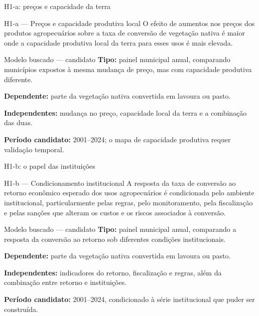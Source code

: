 \documentclass[aspectratio=169,11pt]{beamer}
\begin{document}
\begin{frame}{H1-a: preços e capacidade da terra}
\begin{block}{H1-a — Preços e capacidade produtiva local}
O efeito de aumentos nos preços dos produtos agropecuários sobre a taxa de conversão de vegetação nativa é maior onde a capacidade produtiva local da terra para esses usos é mais elevada.
\end{block}
\medskip
\begin{block}{Modelo buscado — candidato}
\textbf{Tipo:} painel municipal anual, comparando municípios expostos à mesma mudança de preço, mas com capacidade produtiva diferente.\par
\textbf{Dependente:} parte da vegetação nativa convertida em lavoura ou pasto.\par
\textbf{Independentes:} mudança no preço, capacidade local da terra e a combinação das duas.\par
\textbf{Período candidato:} 2001--2024; o mapa de capacidade produtiva requer validação temporal.
\end{block}
\end{frame}

\begin{frame}{H1-b: o papel das instituições}
\begin{block}{H1-b — Condicionamento institucional}
A resposta da taxa de conversão ao retorno econômico esperado dos usos agropecuários é condicionada pelo ambiente institucional, particularmente pelas regras, pelo monitoramento, pela fiscalização e pelas sanções que alteram os custos e os riscos associados à conversão.
\end{block}
\medskip
\begin{block}{Modelo buscado — candidato}
\textbf{Tipo:} painel municipal anual, comparando a resposta da conversão ao retorno sob diferentes condições institucionais.\par
\textbf{Dependente:} parte da vegetação nativa convertida em lavoura ou pasto.\par
\textbf{Independentes:} indicadores do retorno, fiscalização e regras, além da combinação entre retorno e instituições.\par
\textbf{Período candidato:} 2001--2024, condicionado à série institucional que puder ser construída.
\end{block}
\end{frame}
\end{document}
